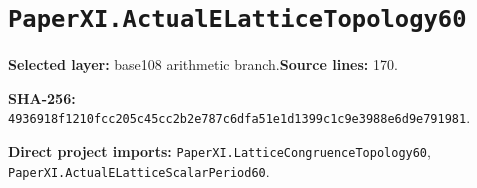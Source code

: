 \documentclass[10pt,oneside]{book}
\begin{document}
\section{\texorpdfstring{\nolinkurl{PaperXI.ActualELatticeTopology60}}{PaperXI.ActualELatticeTopology60}}\label{module:PaperXI.ActualELatticeTopology60}

\textbf{Selected layer:} base108 arithmetic branch.\quad\textbf{Source lines:} 170.\par\textbf{SHA-256:} {\scriptsize\nolinkurl{4936918f1210fcc205c45cc2b2e787c6dfa51e1d1399c1c9e3988e6d9e791981}}.


\textbf{Direct project imports:} \nolinkurl{PaperXI.LatticeCongruenceTopology60}, \nolinkurl{PaperXI.ActualELatticeScalarPeriod60}.
\end{document}
